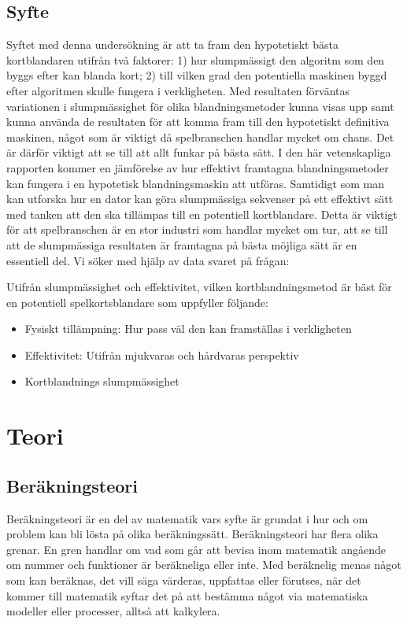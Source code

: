 \documentclass[swedish,a4paper]{article}
\begin{document}
\subsection{Syfte}
\label{sec:purpose}
Syftet med denna undersökning är att ta fram den hypotetiskt bästa kortblandaren
utifrån två faktorer: 1) hur slumpmässigt den algoritm som den byggs efter kan
blanda kort; 2) till vilken grad den potentiella maskinen byggd efter algoritmen
skulle fungera i verkligheten. Med resultaten förväntas variationen i
slumpmässighet för olika blandningsmetoder kunna visas upp samt kunna använda de
resultaten för att komma fram till den hypotetiskt definitiva maskinen, något
som är viktigt då spelbranschen handlar mycket om chans. Det är därför viktigt
att se till att allt funkar på bästa sätt. I den här vetenskapliga rapporten
kommer en jämförelse av hur effektivt framtagna blandningsmetoder kan fungera i
en hypotetisk blandningsmaskin att utföras. Samtidigt som man kan utforska hur
en dator kan göra slumpmässiga sekvenser på ett effektivt sätt med tanken att
den ska tillämpas till en potentiell kortblandare. Detta är viktigt för att
spelbranschen är en stor industri som handlar mycket om tur, att se till att de
slumpmässiga resultaten är framtagna på bästa möjliga sätt är en essentiell del.
Vi söker med hjälp av data svaret på frågan:

Utifrån slumpmässighet och effektivitet, vilken kortblandningsmetod är bäst för
en potentiell spelkortsblandare som uppfyller följande:
\begin{itemize}
	\item Fysiskt tillämpning: Hur pass väl den kan framställas i verkligheten 
	\item Effektivitet: Utifrån mjukvaras och hårdvaras perspektiv
        \item Kortblandnings slumpmässighet
\end{itemize}


\section{Teori}
\subsection{Beräkningsteori}

Beräkningsteori är en del av matematik vars syfte är grundat i hur och om
problem kan bli lösta på olika beräkningssätt. Beräkningsteori har flera olika
grenar. En gren handlar om vad som går att bevisa inom matematik angående om
nummer och funktioner är beräkneliga eller inte. Med beräknelig menas något som
kan beräknas, det vill säga värderas, uppfattas eller förutses, när det kommer
till matematik syftar det på att bestämma något via matematiska
modeller eller processer, alltså att kalkylera.
\end{document}
